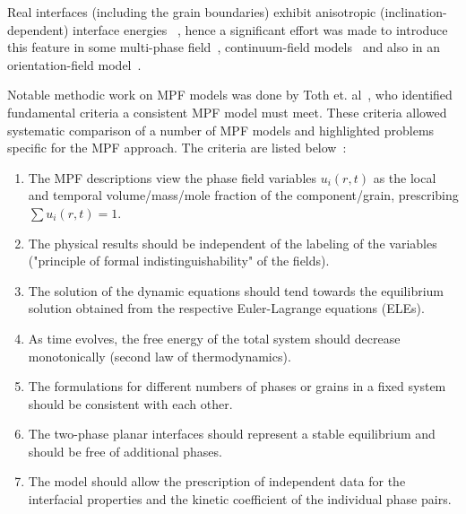 	Real interfaces (including the grain boundaries) exhibit anisotropic (inclination-dependent) interface energies ~\cite{Olmsted2009,Bulatov2014}, hence a significant effort was made to introduce this feature in some multi-phase field~\cite{Garcke1999,Toth2015,Salama2020,Wendler2011}, continuum-field models~\cite{Kazaryan2000,Moelans2008} and also in an orientation-field model~\cite{Henry2012}.
	
	Notable methodic work on MPF models was done by Toth et. al~\cite{Toth2015}, who identified fundamental criteria a consistent MPF model must meet. These criteria allowed systematic comparison of a number of MPF models and highlighted problems specific for the MPF approach. The criteria are listed below~\cite{Toth2015}:
	\begin{enumerate}
		\item The MPF descriptions view the phase field variables \( u_i(r,t) \) as the local and temporal volume/mass/mole fraction of the component/grain, prescribing \( \sum u_i(r,t) = 1 \).  
		\item The physical results should be independent of the labeling of the variables ("principle of formal indistinguishability" of the fields).  
		\item The solution of the dynamic equations should tend towards the equilibrium solution obtained from the respective Euler-Lagrange equations (ELEs).  
		\item As time evolves, the free energy of the total system should decrease monotonically (second law of thermodynamics).  
		\item The formulations for different numbers of phases or grains in a fixed system should be consistent with each other.  
		\item The two-phase planar interfaces should represent a stable equilibrium and should be free of additional phases.  
		\item The model should allow the prescription of independent data for the interfacial properties and the kinetic coefficient of the individual phase pairs.  
	\end{enumerate}
